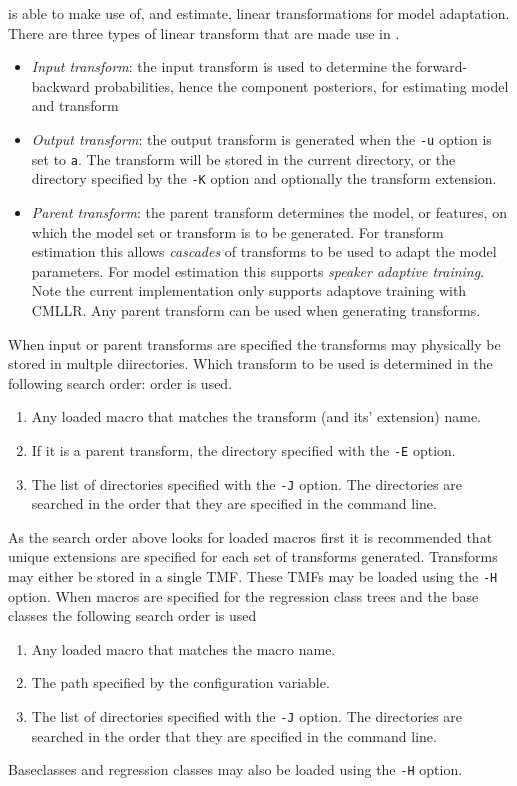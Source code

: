  is able to make use of, and estimate, linear
transformations for model adaptation. There are three types of linear
transform that are made use in .
\begin{itemize}
\item {\it Input transform}: the input transform is used to determine
the forward-backward probabilities, hence the component posteriors, for 
estimating model and transform 
\item {\it Output transform}: the output transform is generated when the 
{\tt -u} option is set to {\tt a}. The transform will be stored in the 
current directory, or the directory specified by the {\tt -K} option
and optionally the transform extension.
\item {\it Parent transform}: the parent transform determines the 
model, or features, on which the model set or transform is to be 
generated. For transform estimation this allows {\em cascades} of transforms
to be used to adapt the model parameters. For model estimation this 
supports {\em speaker adaptive training}. Note the current implementation 
only supports adaptove training with CMLLR. Any parent transform can be
used when generating transforms.
\end{itemize}
When input or parent transforms are specified the transforms may 
physically be stored in multple diirectories. Which transform to be used 
is determined in the following search order:
order is used.
\begin{enumerate}
\item Any loaded macro that matches the transform (and its' extension) name.
\item If it is a parent transform, the directory specified with the 
{\tt -E} option.
\item The list of directories specified with the {\tt -J} option.
The directories are searched in the order that they are specified
in the command line.
\end{enumerate}
As the search order above looks for loaded macros first it is 
recommended that unique extensions are specified for each set of
transforms generated. Transforms may either be stored in 
a single TMF. These TMFs may be loaded using the {\tt -H} option.
When macros are specified for the regression class trees and 
the base classes the following search order is used
\begin{enumerate}
\item Any loaded macro that matches the macro name.
\item The path specified by the configuration variable.
\item The list of directories specified with the {\tt -J} option.
The directories are searched in the order that they are specified
in the command line.
\end{enumerate}
Baseclasses and regression classes may also be loaded using the 
{\tt -H} option.

